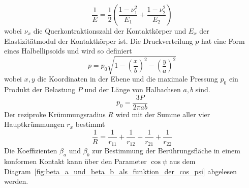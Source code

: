 \begin{equation}
    \label{eq:reduzierter_elastizitaetsmodul}
    \frac{1}{E} = \frac{1}{2}  \left( \frac{1 - \nu_1^2}{E_1} + \frac{1 - \nu_2^2}{E_2} \right)
\end{equation}
%
wobei $\nu_x$ die Querkontraktionszahl der Kontaktkörper und $E_x$ der Elastizitätmodul der Kontaktkörper ist.
Die Druckverteilung $p$ hat eine Form eines Halbellipsoids und wird so definiert
\begin{equation}
    \label{eq:druckverteilung}
    p = p_0  \sqrt{1 - \left( \frac{x}{b} \right)^2 - \left( \frac{y}{a} \right)^2}
\end{equation}
%
wobei $x, y$ die Koordinaten in der Ebene und die maximale Pressung $p_0$ ein Produkt der Belastung $P$ und der Länge von Halbachsen $a, b$ sind.
\begin{equation}
    \label{eq:maximale_pressung}
    p_0 = \frac{3  P}{2  \pi  a  b}
\end{equation}
%
Der reziproke Krümmungsradius $R$ wird mit der Summe aller vier Hauptkrümmungen $r_x$ bestimmt
\begin{equation}
    \label{eq:kruemmungsradius}
    \frac{1}{R} = \frac{1}{r_{11}} + \frac{1}{r_{12}} + \frac{1}{r_{21}} + \frac{1}{r_{22}}
\end{equation}
%
Die Koeffizienten $\beta_a$ und $\beta_b$ zur Bestimmung der Berührungsfläche in einem konformen Kontakt kann über den Parameter $\cos{\psi}$ aus dem Diagram~\ref{fig:beta_a_und_beta_b_als_funktion_der_cos_psi} abgelesen werden.

